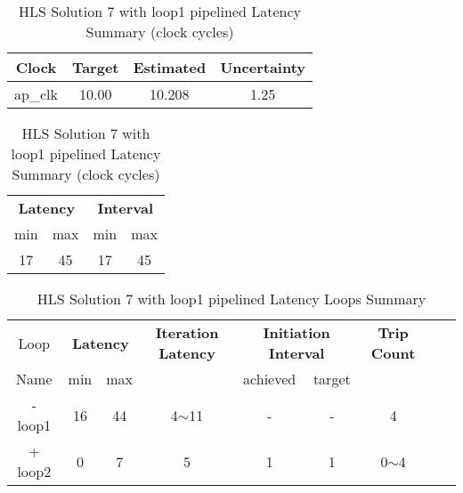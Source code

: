 \begin{table}[H]
	\centering
	\begin{minipage}[t]{0.45\linewidth}
		\centering
		\begin{tabular}{|c|c|c|c|}
			\hline
			\textbf{Clock} & \textbf{Target} & \textbf{Estimated} & \textbf{Uncertainty} \\
			\hline
			ap\_clk & 10.00 & 10.208 & 1.25 \\
			\hline
		\end{tabular}
		\caption{HLS Solution 7 with loop1 pipelined Timing Summary (ns)}
		\label{tab:hls-solution-7-loop1-pipelined-timing-summary}
	\end{minipage}
	\hfill
	\begin{minipage}[t]{0.45\linewidth}
		\centering
		\begin{tabular}{|c|c|c|c|}
			\hline
			\multicolumn{2}{|c|}{\textbf{Latency}} & \multicolumn{2}{|c|}{\textbf{Interval}} \\
			min & max & min & max \\
			\hline
			17 & 45 & 17 & 45 \\
			\hline
		\end{tabular}
		\caption{HLS Solution 7 with loop1 pipelined Latency Summary (clock cycles)}
		\label{tab:hls-solution-7-loop1-pipeline-latency-summary}
	\end{minipage}
\end{table}

\begin{table}[H]
	\centering
	\begin{tabular}{|c|c|c|c|c|c|c|c|c|}
		\hline
		\multicolumn{1}{|c|}{Loop} & \multicolumn{2}{|c|}{\textbf{Latency}} & \multicolumn{1}{c|}{\textbf{Iteration Latency}} & \multicolumn{2}{c|}{\textbf{Initiation Interval}} & \multicolumn{1}{c|}{\textbf{Trip Count}}  \\
		Name & min & max &  & achieved & target &  \\
		\hline
		- loop1 & 16 & 44 & 4$\sim$11 & - & - & 4 \\
		+ loop2 & 0 & 7 & 5 & 1 & 1 & 0$\sim$4 \\
		\hline
	\end{tabular}
	\caption{HLS Solution 7 with loop1 pipelined Latency Loops Summary}
	\label{tab:hls-solution-7-loop1-pipeline-loop-summary}
\end{table}

